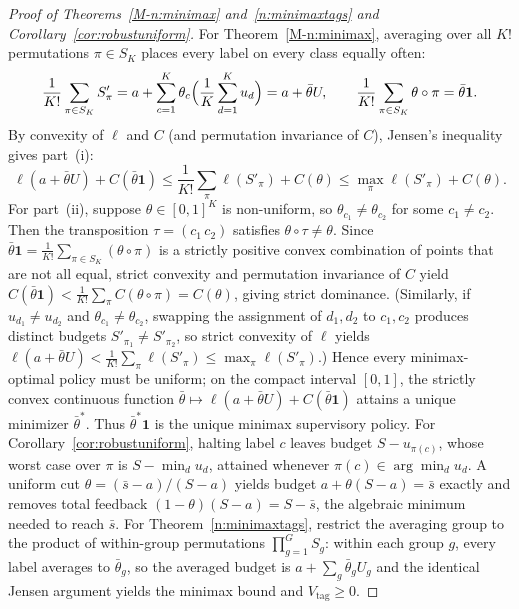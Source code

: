 \documentclass[12pt]{article}
\theoremstyle{definition}
\theoremstyle{remark}
\begin{document}
\begin{proof}[Proof of Theorems~\ref{M-n:minimax} and~\ref{n:minimaxtags} and Corollary~\ref{cor:robustuniform}]
For Theorem~\ref{M-n:minimax}, averaging over all $K!$ permutations $\pi \in S_K$ places every label on every class equally often:
\[
  \frac{1}{K!} \sum_{\pi \in S_K} S'_\pi = a + \sum_{c=1}^K \theta_c \Bigl(\frac{1}{K} \sum_{d=1}^K u_d\Bigr) = a + \bar{\theta} U,
  \qquad
  \frac{1}{K!} \sum_{\pi \in S_K} \theta \circ \pi = \bar{\theta}\mathbf{1}.
\]
By convexity of $\ell$ and $C$ (and permutation invariance of $C$), Jensen's inequality gives part~(i):
\[
  \ell(a + \bar{\theta} U) + C(\bar{\theta}\mathbf{1})
  \le \frac{1}{K!} \sum_{\pi} \ell(S'_\pi) + C(\theta)
  \le \max_{\pi} \ell(S'_\pi) + C(\theta).
\]
For part~(ii), suppose $\theta \in [0, 1]^K$ is non-uniform, so $\theta_{c_1} \neq \theta_{c_2}$ for some $c_1 \neq c_2$. Then the transposition $\tau = (c_1\, c_2)$ satisfies $\theta \circ \tau \neq \theta$. Since $\bar{\theta}\mathbf{1} = \frac{1}{K!}\sum_{\pi \in S_K} (\theta \circ \pi)$ is a strictly positive convex combination of points that are not all equal, strict convexity and permutation invariance of $C$ yield $C(\bar{\theta}\mathbf{1}) < \frac{1}{K!}\sum_\pi C(\theta \circ \pi) = C(\theta)$, giving strict dominance. (Similarly, if $u_{d_1} \neq u_{d_2}$ and $\theta_{c_1} \neq \theta_{c_2}$, swapping the assignment of $d_1, d_2$ to $c_1, c_2$ produces distinct budgets $S'_{\pi_1} \neq S'_{\pi_2}$, so strict convexity of $\ell$ yields $\ell(a + \bar{\theta} U) < \frac{1}{K!}\sum_\pi \ell(S'_\pi) \le \max_\pi \ell(S'_\pi)$.) Hence every minimax-optimal policy must be uniform; on the compact interval $[0, 1]$, the strictly convex continuous function $\bar{\theta} \mapsto \ell(a + \bar{\theta} U) + C(\bar{\theta}\mathbf{1})$ attains a unique minimizer $\bar{\theta}^*$. Thus $\bar{\theta}^*\mathbf{1}$ is the unique minimax supervisory policy.
For Corollary~\ref{cor:robustuniform}, halting label $c$ leaves budget $S - u_{\pi(c)}$, whose worst case over $\pi$ is $S - \min_d u_d$, attained whenever $\pi(c) \in \arg\min_d u_d$. A uniform cut $\theta = (\bar{s} - a)/(S - a)$ yields budget $a + \theta(S - a) = \bar{s}$ exactly and removes total feedback $(1 - \theta)(S - a) = S - \bar{s}$, the algebraic minimum needed to reach $\bar{s}$. For Theorem~\ref{n:minimaxtags}, restrict the averaging group to the product of within-group permutations $\prod_{g=1}^G S_g$: within each group $g$, every label averages to $\bar{\theta}_g$, so the averaged budget is $a + \sum_g \bar{\theta}_g U_g$ and the identical Jensen argument yields the minimax bound and $V_{\mathrm{tag}} \ge 0$.
\end{proof}
\end{document}
